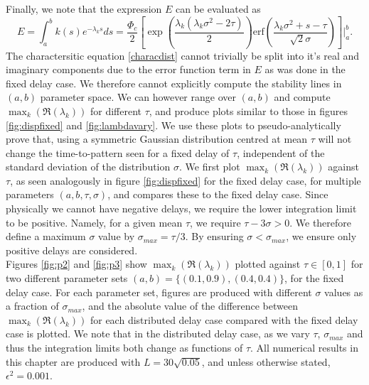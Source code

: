 Finally, we note that the expression $E$ can be evaluated as
\begin{equation}
E=\int_a^bk(s)e^{-\lambda_k s}ds=\frac{\Phi_c}{2}\left[\exp\left(\frac{\lambda_k(\lambda_k\sigma^2-2\tau)}{2}\right) \text{erf} \left(\frac{\lambda_k\sigma^2+s-\tau}{\sqrt{2}\sigma}\right)\right]\Bigg|_a^b.
\end{equation}
The charactersitic equation \eqref{characdist} cannot trivially be split into it's real and imaginary components due to the error function term in $E$ as was done in the fixed delay case. We therefore cannot explicitly compute the stability lines in $(a,b)$ parameter space. We can however range over $(a,b)$ and compute $\max_k(\Re(\lambda_k))$ for different $\tau$, and produce plots similar to those in figures \ref{fig:dispfixed} and \ref{fig:lambdavary}. We use these plots to pseudo-analytically prove that, using a symmetric Gaussian distribution centred at mean $\tau$ will not change the time-to-pattern seen for a fixed delay of $\tau$, independent of the standard deviation of the distribution $\sigma$. We first plot $\max_k(\Re(\lambda_k))$ against $\tau$, as seen analogously in figure \ref{fig:dispfixed} for the fixed delay case, for multiple parameters $(a,b,\tau,\sigma)$, and compares these to the fixed delay case. Since physically we cannot have negative delays, we require the lower integration limit to be positive. Namely, for a given mean $\tau$, we require $\tau-3\sigma>0$. We therefore define a maximum $\sigma$ value by $\sigma_{max}=\tau / 3$. By ensuring $\sigma<\sigma_{max}$, we ensure only positive delays are considered.
\\
Figures \ref{fig:p2} and \ref{fig:p3} show $\max_k(\Re(\lambda_k))$ plotted against $\tau\in[0,1]$ for two different parameter sets $(a,b)=\{(0.1,0.9), (0.4,0.4)\}$, for the fixed delay case. For each parameter set, figures are produced with different $\sigma$ values as a fraction of $\sigma_{max}$, and the absolute value of the difference between $\max_k(\Re(\lambda_k))$ for each distributed delay case compared with the fixed delay case is plotted. We note that in the distributed delay case, as we vary $\tau$, $\sigma_{max}$ and thus the integration limits both change as functions of $\tau$. All numerical results in this chapter are produced with $L=30\sqrt{0.05}$, and unless otherwise stated, $\epsilon^2=0.001$.

